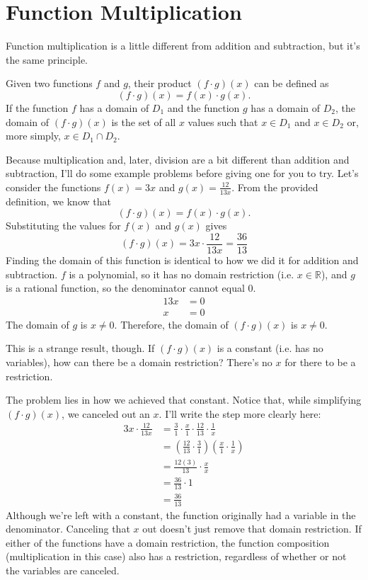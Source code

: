 \clearpage\section{Function Multiplication}
Function multiplication is a little different from addition and subtraction, but it's the same principle. 
\begin{definition}
    Given two functions $f$ and $g$, their product $(f \cdot g)(x)$ can be defined as
    \[
        (f \cdot g)(x) = f(x) \cdot g(x) \text{.}
    \]
    If the function $f$ has a domain of $D_1$ and the function $g$ has a domain of $D_2$, the domain of $(f \cdot g)(x)$ is the set of all $x$ values such that $x \in D_1$ and $x \in D_2$ or, more simply, $x \in D_1 \cap D_2$.
\end{definition}

Because multiplication and, later, division are a bit different than addition and subtraction, I'll do some example problems before giving one for you to try. Let's consider the functions $f(x) = 3x$ and $g(x) = \frac{12}{13x}$. From the provided definition, we know that
\[
(f \cdot g)(x) = f(x) \cdot g(x) \text{.}
\]
Substituting the values for $f(x)$ and $g(x)$ gives 
\[
(f \cdot g)(x) = 3x \cdot \frac{12}{13x} = \frac{36}{13}
\]
Finding the domain of this function is identical to how we did it for addition and subtraction. $f$ is a polynomial, so it has no domain restriction (i.e. $x \in \mathbb{R}$), and $g$ is a rational function, so the denominator cannot equal $0$.
\begin{align*}
    13x &= 0 \\
    x &= 0
\end{align*}
The domain of $g$ is $x \neq 0$. Therefore, the domain of $(f \cdot g)(x)$ is $x \neq 0$.

\clearpage
This is a strange result, though. If $(f \cdot g)(x)$ is a constant (i.e. has no variables), how can there be a domain restriction? There's no $x$ for there to be a restriction. 

The problem lies in how we achieved that constant. Notice that, while simplifying $(f \cdot g)(x)$, we canceled out an $x$. I'll write the step more clearly here:
\begin{align*}
3x \cdot \frac{12}{13x} &= \frac{3}{1} \cdot \frac{x}{1} \cdot \frac{12}{13} \cdot \frac{1}{x} \\
&=\left(\frac{12}{13} \cdot \frac{3}{1}\right)\left( \frac{x}{1} \cdot \frac{1}{x}\right) \\
&= \frac{12(3)}{13} \cdot \frac{x}{x} \\
&= \frac{36}{13} \cdot 1 \\
&= \frac{36}{13}
\end{align*}
Although we're left with a constant, the function originally had a variable in the denominator. Canceling that $x$ out doesn't just remove that domain restriction. If either of the functions have a domain restriction, the function composition (multiplication in this case) also has a restriction, regardless of whether or not the variables are canceled.

